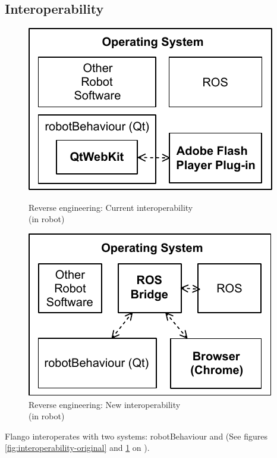 \subsection{Interoperability}
\label{sec:interoperability}
\begin{figure}[htb]
  \begin{minipage}{0.5\linewidth} 
      \centering
      \includegraphics{figures/interoperability-original.pdf}
      \caption{Reverse engineering: Current interoperability \\ (in robot)}
      \label{fig:interoperability-original}
  \end{minipage}
  \hspace{0.5cm}
  \begin{minipage}{0.5\linewidth} 
      \centering
      \includegraphics{figures/interoperability-new.pdf}
      \caption{Reverse engineering: New interoperability \\ (in robot)}
      \label{fig:interoperability-new}
  \end{minipage}
\end{figure}

Flango \cm interoperates with two systems: robotBehaviour and \flangobe (See figures \ref{fig:interoperability-original} and \ref{fig:interoperability-new} on \pageref{fig:interoperability-original}).

